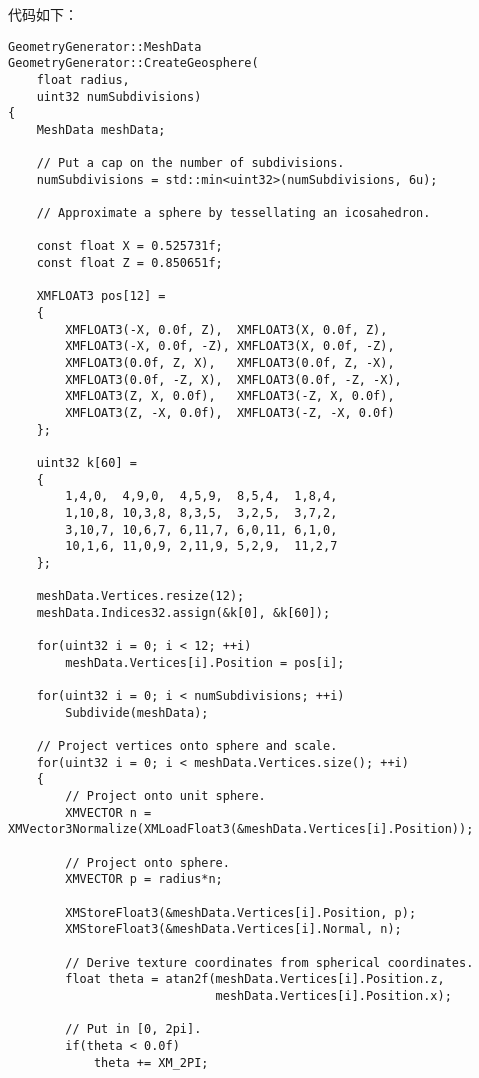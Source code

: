 \begin{flushleft}
代码如下：\\
\end{flushleft}
\begin{lstlisting}
GeometryGenerator::MeshData 
GeometryGenerator::CreateGeosphere(
    float radius, 
    uint32 numSubdivisions)
{
    MeshData meshData;

    // Put a cap on the number of subdivisions.
    numSubdivisions = std::min<uint32>(numSubdivisions, 6u);

    // Approximate a sphere by tessellating an icosahedron.

    const float X = 0.525731f; 
    const float Z = 0.850651f;

    XMFLOAT3 pos[12] = 
    {
        XMFLOAT3(-X, 0.0f, Z),  XMFLOAT3(X, 0.0f, Z),  
        XMFLOAT3(-X, 0.0f, -Z), XMFLOAT3(X, 0.0f, -Z),    
        XMFLOAT3(0.0f, Z, X),   XMFLOAT3(0.0f, Z, -X), 
        XMFLOAT3(0.0f, -Z, X),  XMFLOAT3(0.0f, -Z, -X),    
        XMFLOAT3(Z, X, 0.0f),   XMFLOAT3(-Z, X, 0.0f), 
        XMFLOAT3(Z, -X, 0.0f),  XMFLOAT3(-Z, -X, 0.0f)
    };

    uint32 k[60] =
    {
        1,4,0,  4,9,0,  4,5,9,  8,5,4,  1,8,4,    
        1,10,8, 10,3,8, 8,3,5,  3,2,5,  3,7,2,    
        3,10,7, 10,6,7, 6,11,7, 6,0,11, 6,1,0, 
        10,1,6, 11,0,9, 2,11,9, 5,2,9,  11,2,7 
    };

    meshData.Vertices.resize(12);
    meshData.Indices32.assign(&k[0], &k[60]);

    for(uint32 i = 0; i < 12; ++i)
        meshData.Vertices[i].Position = pos[i];

    for(uint32 i = 0; i < numSubdivisions; ++i)
        Subdivide(meshData);

    // Project vertices onto sphere and scale.
    for(uint32 i = 0; i < meshData.Vertices.size(); ++i)
    {
        // Project onto unit sphere.
        XMVECTOR n = XMVector3Normalize(XMLoadFloat3(&meshData.Vertices[i].Position));

        // Project onto sphere.
        XMVECTOR p = radius*n;

        XMStoreFloat3(&meshData.Vertices[i].Position, p);
        XMStoreFloat3(&meshData.Vertices[i].Normal, n);

        // Derive texture coordinates from spherical coordinates.
        float theta = atan2f(meshData.Vertices[i].Position.z, 
                             meshData.Vertices[i].Position.x);

        // Put in [0, 2pi].
        if(theta < 0.0f)
            theta += XM_2PI;


\end{lstlisting}
